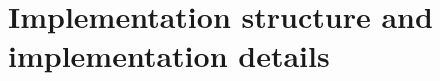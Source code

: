 \chapter{Implementation structure and implementation details} %
\label{cha:implementation_structure_and_implementation_details}
